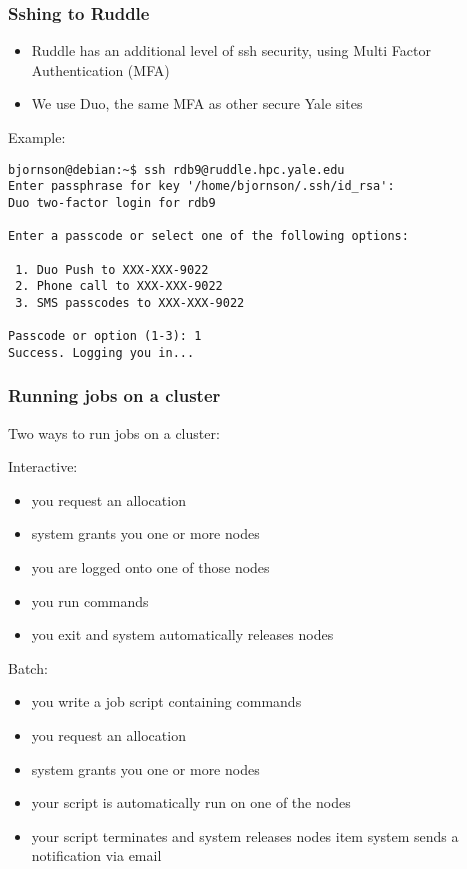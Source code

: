 \documentclass[10pt]{beamer}
\begin{document}
\begin{frame}[fragile]
\frametitle{Sshing to Ruddle}

\begin{itemize}
\item Ruddle has an additional level of ssh security, using Multi Factor Authentication (MFA)
\item We use Duo, the same MFA as other secure Yale sites
\end{itemize}

Example:
\begin{verbatim}
bjornson@debian:~$ ssh rdb9@ruddle.hpc.yale.edu
Enter passphrase for key '/home/bjornson/.ssh/id_rsa': 
Duo two-factor login for rdb9

Enter a passcode or select one of the following options:

 1. Duo Push to XXX-XXX-9022
 2. Phone call to XXX-XXX-9022
 3. SMS passcodes to XXX-XXX-9022

Passcode or option (1-3): 1
Success. Logging you in...
\end{verbatim}  
\end{frame}
\begin{frame}[fragile]
\frametitle{Running jobs on a cluster}

Two ways to run jobs on a cluster:

Interactive:
\begin{itemize}
\item you request an allocation
\item system grants you one or more nodes
\item you are logged onto one of those nodes
\item you run commands
\item you exit and system automatically releases nodes
\end{itemize}

Batch:
\begin{itemize}
\item you write a job script containing commands
\item you request an allocation
\item system grants you one or more nodes
\item your script is automatically run on one of the nodes
\item your script terminates and system releases nodes
item system sends a notification via email
\end{itemize}

\end{frame}
\end{document}
